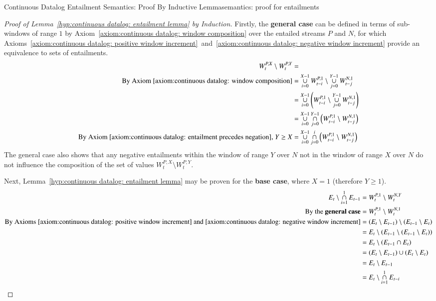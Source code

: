 \begin{nestedsection}{Continuous Datalog Entailment Semantics: Proof By Inductive Lemma}{semantics: proof for entailments}
\begin{proof}[Proof of Lemma~\ref{hyp:continuous datalog: entailment lemma} by Induction]
		Firstly, the \textbf{general case} can be defined in terms of sub-windows of range $1$ by Axiom~\ref{axiom:continuous datalog: window composition} over the entailed streams $P$ and $N$, for which Axioms~\ref{axiom:continuous datalog: positive window increment}~and~\ref{axiom:continuous datalog: negative window increment} provide an equivalence to sets of entailments.
		\begin{align*}
			W^{P,X}_t \setminus W^{P,Y}_t & = \\
			\text{By Axiom~\ref{axiom:continuous datalog: window composition}} & = \mathop{\cup}^{X-1}_{i=0}W^{P,1}_{t-i} \setminus \mathop{\cup}^{Y-1}_{j=0}W^{N,1}_{t-j} \\
			& = \mathop{\cup}^{X-1}_{i=0} \left( W^{P,1}_{t-i} \setminus \mathop{\cup}^{Y-1}_{j=0}W^{N,1}_{t-j} \right) \\
			& = \mathop{\cup}^{X-1}_{i=0}\mathop{\cap}^{Y-1}_{j=0} \left( W^{P,1}_{t-i} \setminus W^{N,1}_{t-j} \right) \\
			\text{By Axiom~\ref{axiom:continuous datalog: entailment precedes negation}, } Y \geq X & = \mathop{\cup}^{X-1}_{i=0}\mathop{\cap}^{i}_{j=0} \left( W^{P,1}_{t-i} \setminus W^{N,1}_{t-j} \right)
		\end{align*}
		The general case also shows that any negative entailments within the window of range $Y$ over $N$ not in the window of range $X$ over $N$ do not influence the composition of the set of values ${W^{P,X}_t \setminus W^{P,Y}_t}$.

		Next, Lemma~\ref{hyp:continuous datalog: entailment lemma} may be proven for the \textbf{base case}, where ${X = 1}$ (therefore ${Y \geq 1}$).
		\begin{align*}
			E_t \setminus \mathop{\cap}^{1}_{i=1} E_{t-1} & = W^{P,1}_t \setminus W^{N,Y}_t \\
			\text{By the \textbf{general case}} & = W^{P,1}_t \setminus W^{N,1}_t \\
			\text{By Axioms~\ref{axiom:continuous datalog: positive window increment}~and~\ref{axiom:continuous datalog: negative window increment}} & = \left( E_t \setminus E_{t-1} \right) \setminus \left( E_{t-1} \setminus E_t \right) \\
			& = E_t \setminus \left( E_{t-1} \setminus \left( E_{t-1} \setminus E_t \right) \right) \\
			& = E_t \setminus \left( E_{t-1} \cap E_t \right) \\
			& = \left( E_t \setminus E_{t-1} \right) \cup \left( E_t \setminus E_t \right) \\
			& = E_t \setminus E_{t-1} \\
			& = E_t \setminus \mathop{\cap}^{1}_{i=1} E_{t-i}
		\end{align*}


\end{proof}
\end{nestedsection}
